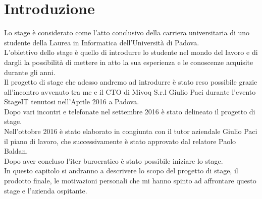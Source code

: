 \chapter{Introduzione} %
Lo stage è considerato come l'atto conclusivo della carriera universitaria di uno studente della Laurea in Informatica dell'Università di Padova.\\
L'obiettivo dello stage è quello di introdurre lo studente nel mondo del lavoro e di dargli la possibilità di mettere in atto la sua esperienza e le conoscenze acquisite durante gli anni.\\
Il progetto di stage che adesso andremo ad introdurre è stato reso possibile grazie all'incontro avvenuto tra me e il CTO di Mivoq S.r.l Giulio Paci durante l'evento StageIT tenutosi nell'Aprile 2016 a Padova.\\
Dopo vari incontri e telefonate nel settembre 2016 è stato delineato il progetto di stage.\\
Nell'ottobre 2016 è stato elaborato in congiunta con il tutor aziendale Giulio Paci il piano di lavoro, che successivamente è stato approvato dal relatore Paolo Baldan.\\
Dopo aver concluso l'iter burocratico è stato possibile iniziare lo stage.\\    
In questo capitolo si andranno a descrivere lo scopo del progetto di stage, il prodotto finale, le motivazioni personali che mi hanno spinto ad affrontare questo stage e l'azienda ospitante.\\
\thispagestyle{empty}
\newpage
